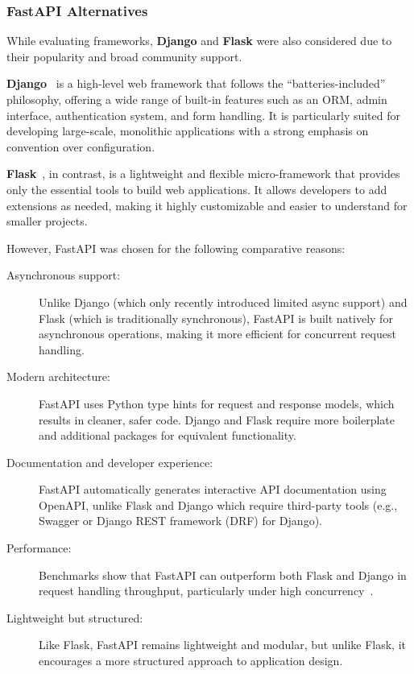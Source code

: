 \subsubsection{FastAPI Alternatives}

While evaluating frameworks, \textbf{Django} and \textbf{Flask} were also considered due to their popularity and broad community support. 

\textbf{Django}~\cite{Django} is a high-level web framework that follows the “batteries-included” philosophy, offering a wide range of built-in features such as an ORM, admin interface, authentication system, and form handling. It is particularly suited for developing large-scale, monolithic applications with a strong emphasis on convention over configuration.

\textbf{Flask}~\cite{Flask}, in contrast, is a lightweight and flexible micro-framework that provides only the essential tools to build web applications. It allows developers to add extensions as needed, making it highly customizable and easier to understand for smaller projects.

However, FastAPI was chosen for the following comparative reasons:

\begin{description}
  \item[Asynchronous support:] Unlike Django (which only recently introduced limited async support) and Flask (which is traditionally synchronous), FastAPI is built natively for asynchronous operations, making it more efficient for concurrent request handling.
  \item[Modern architecture:] FastAPI uses Python type hints for request and response models, which results in cleaner, safer code. Django and Flask require more boilerplate and additional packages for equivalent functionality.
  \item[Documentation and developer experience:] FastAPI automatically generates interactive API documentation using OpenAPI, unlike Flask and Django which require third-party tools (e.g., Swagger or Django REST framework (DRF) for Django).
  \item[Performance:] Benchmarks show that FastAPI can outperform both Flask and Django in request handling throughput, particularly under high concurrency~\cite{FastAPIBenchmarks}.
  \item[Lightweight but structured:] Like Flask, FastAPI remains lightweight and modular, but unlike Flask, it encourages a more structured approach to application design.
\end{description}

